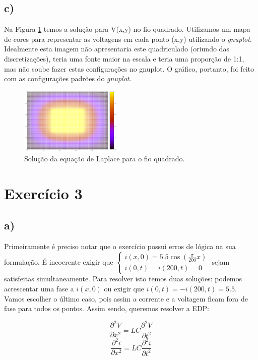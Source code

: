 \documentclass[a4wide]{report}
\begin{document}
\subsection*{c)}
Na Figura \ref{2c} temos a solução para V(x,y) no fio quadrado. Utilizamos um mapa de cores para representar as voltagens em cada ponto (x,y) utilizando o \textit{gnuplot}. Idealmente esta imagem não apresentaria este quadriculado (oriundo das discretizações), teria uma fonte maior na escala e teria uma proporção de 1:1, mas não soube fazer estas configurações no gnuplot. O gráfico, portanto, foi feito com as configurações padrões do \textit{gnuplot}.
\begin{figure}[!htb]
\centering
\includegraphics[width=0.447\textwidth]{2.pdf}
\caption{Solução da equação de Laplace para o fio quadrado.}
\label{2c}
\end{figure}



\section*{Exercício 3}
\subsection*{a)}
Primeiramente é preciso notar que o exercício possui erros de lógica na sua formulação. É incoerente exigir que $\begin{cases} 
i(x,0) = 5.5 \cos\left( \frac{\pi }{200}x \right) \\
i(0,t) = i(200,t) = 0
\end{cases} $
sejam satisfeitas simultaneamente. Para resolver isto temos duas soluções: podemos acrescentar uma fase a $i(x,0)$ ou exigir que $i(0,t) = -i(200,t) = 5.5$. Vamos escolher o último caso, pois assim a corrente e a voltagem ficam fora de fase para todos os pontos. Assim sendo, queremos resolver a EDP:

\begin{equation*}
\frac{\partial^2 V}{\partial x^2} = LC \frac{\partial^2 V}{\partial t^2}
\end{equation*}
\begin{equation*}
\frac{\partial^2 i}{\partial x^2} = LC \frac{\partial^2 i}{\partial t^2}
\end{equation*}
\end{document}
